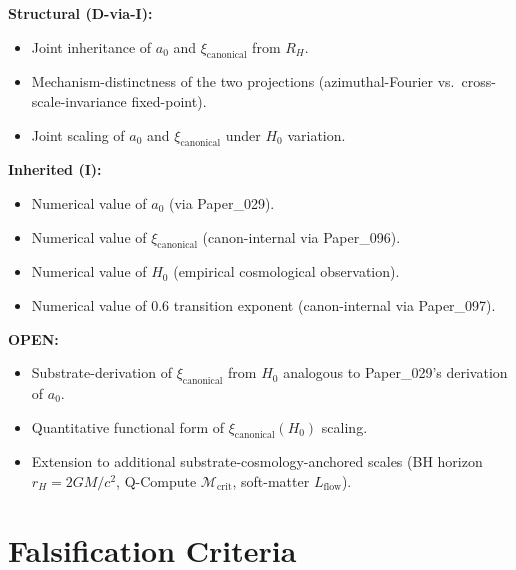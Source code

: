 \documentclass[11pt,a4paper]{article}
\begin{document}
\textbf{Structural (D-via-I):}
\begin{itemize}[noitemsep]
\item Joint inheritance of $a_0$ and $\xi_\mathrm{canonical}$ from $R_H$.
\item Mechanism-distinctness of the two projections (azimuthal-Fourier vs.\ cross-scale-invariance fixed-point).
\item Joint scaling of $a_0$ and $\xi_\mathrm{canonical}$ under $H_0$ variation.
\end{itemize}

\textbf{Inherited (I):}
\begin{itemize}[noitemsep]
\item Numerical value of $a_0$ (via Paper\_029).
\item Numerical value of $\xi_\mathrm{canonical}$ (canon-internal via Paper\_096).
\item Numerical value of $H_0$ (empirical cosmological observation).
\item Numerical value of 0.6 transition exponent (canon-internal via Paper\_097).
\end{itemize}

\textbf{OPEN:}
\begin{itemize}[noitemsep]
\item Substrate-derivation of $\xi_\mathrm{canonical}$ from $H_0$ analogous to Paper\_029's derivation of $a_0$.
\item Quantitative functional form of $\xi_\mathrm{canonical}(H_0)$ scaling.
\item Extension to additional substrate-cosmology-anchored scales (BH horizon $r_H = 2GM/c^2$, Q-Compute $\mathcal{M}_\mathrm{crit}$, soft-matter $L_\mathrm{flow}$).
\end{itemize}

\section{Falsification Criteria}
\end{document}

